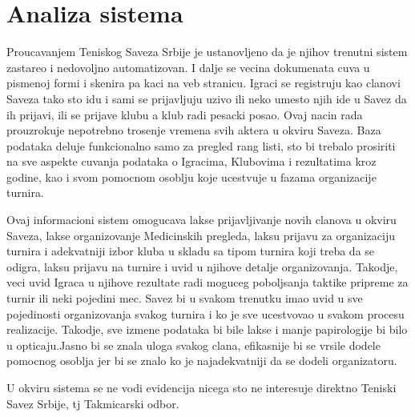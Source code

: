 \documentclass{article}
\begin{document}
\section{Analiza sistema}
Proucavanjem Teniskog Saveza Srbije je ustanovljeno da je njihov trenutni sistem zastareo i nedovoljno automatizovan. I dalje se vecina dokumenata cuva u pismenoj formi i skenira pa kaci na veb stranicu. Igraci se registruju kao clanovi Saveza tako sto idu i sami se prijavljuju uzivo ili neko umesto njih ide u Savez da ih prijavi, ili se prijave klubu a klub radi pesacki posao. Ovaj nacin rada prouzrokuje nepotrebno trosenje vremena svih aktera u okviru Saveza. Baza podataka deluje funkcionalno samo za pregled rang listi, sto bi trebalo prosiriti na sve aspekte cuvanja podataka o Igracima, Klubovima i rezultatima kroz godine, kao i svom pomocnom osoblju koje ucestvuje u fazama organizacije turnira.\par
Ovaj informacioni sistem omogucava lakse prijavljivanje novih clanova u okviru Saveza, lakse organizovanje Medicinskih pregleda, laksu prijavu za organizaciju turnira i adekvatniji izbor kluba u skladu sa tipom turnira koji treba da se odigra, laksu prijavu na turnire i uvid u njihove detalje organizovanja. Takodje, veci uvid Igraca u njihove rezultate radi moguceg poboljsanja taktike pripreme za turnir ili neki pojedini mec. Savez bi u svakom trenutku imao uvid u sve pojedinosti organizovanja svakog turnira i ko je sve ucestvovao u svakom procesu realizacije. Takodje, sve izmene podataka bi bile lakse i manje papirologije bi bilo u opticaju.Jasno bi se znala uloga svakog clana, efikasnije bi se vrsile dodele pomocnog osoblja jer bi se znalo ko je najadekvatniji da se dodeli organizatoru. \par
U okviru sistema se ne vodi evidencija nicega sto ne interesuje direktno Teniski Savez Srbije, tj Takmicarski odbor. 
\end{document}
